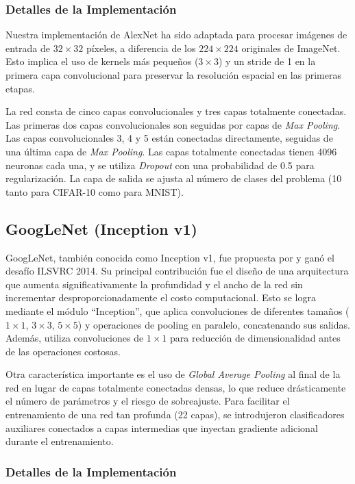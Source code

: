 \documentclass{pas}
\begin{document}
\subsubsection{Detalles de la Implementación}

Nuestra implementación de AlexNet ha sido adaptada para procesar imágenes de entrada de $32 \times 32$ píxeles, a diferencia de los $224 \times 224$ originales de ImageNet. Esto implica el uso de kernels más pequeños ($3 \times 3$) y un stride de 1 en la primera capa convolucional para preservar la resolución espacial en las primeras etapas.

La red consta de cinco capas convolucionales y tres capas totalmente conectadas. Las primeras dos capas convolucionales son seguidas por capas de \textit{Max Pooling}. Las capas convolucionales 3, 4 y 5 están conectadas directamente, seguidas de una última capa de \textit{Max Pooling}. Las capas totalmente conectadas tienen 4096 neuronas cada una, y se utiliza \textit{Dropout} con una probabilidad de 0.5 para regularización. La capa de salida se ajusta al número de clases del problema (10 tanto para CIFAR-10 como para MNIST).

\subsection{GoogLeNet (Inception v1)}

GoogLeNet, también conocida como Inception v1, fue propuesta por \cite{DBLP:journals/corr/SzegedyLJSRAEVR14} y ganó el desafío ILSVRC 2014. Su principal contribución fue el diseño de una arquitectura que aumenta significativamente la profundidad y el ancho de la red sin incrementar desproporcionadamente el costo computacional. Esto se logra mediante el módulo ``Inception'', que aplica convoluciones de diferentes tamaños ($1 \times 1$, $3 \times 3$, $5 \times 5$) y operaciones de pooling en paralelo, concatenando sus salidas. Además, utiliza convoluciones de $1 \times 1$ para reducción de dimensionalidad antes de las operaciones costosas.

Otra característica importante es el uso de \textit{Global Average Pooling} al final de la red en lugar de capas totalmente conectadas densas, lo que reduce drásticamente el número de parámetros y el riesgo de sobreajuste. Para facilitar el entrenamiento de una red tan profunda (22 capas), se introdujeron clasificadores auxiliares conectados a capas intermedias que inyectan gradiente adicional durante el entrenamiento.

\subsubsection{Detalles de la Implementación}
\end{document}
